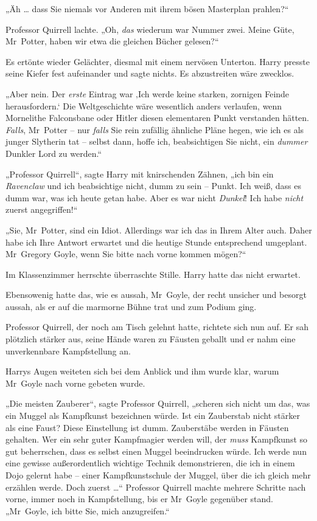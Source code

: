 {„Äh … dass Sie niemals vor Anderen mit ihrem bösen Masterplan prahlen?“

Professor Quirrell lachte. „Oh, \emph{das} wiederum war Nummer zwei. Meine Güte, Mr~Potter, haben wir etwa die gleichen Bücher gelesen?“

Es ertönte wieder Gelächter, diesmal mit einem nervösen Unterton. Harry presste seine Kiefer fest aufeinander und sagte nichts. Es abzustreiten wäre zwecklos.

„Aber nein. Der \emph{erste} Eintrag war ‚Ich werde keine starken, zornigen Feinde herausfordern.` Die Weltgeschichte wäre wesentlich anders verlaufen, wenn Mornelithe Falconsbane oder Hitler diesen elementaren Punkt verstanden hätten. \emph{Falls}, Mr~Potter -- nur \emph{falls} Sie rein zufällig ähnliche Pläne hegen, wie ich es als junger Slytherin tat -- selbst dann, hoffe ich, beabsichtigen Sie nicht, ein \emph{dummer} Dunkler Lord zu werden.“

„Professor Quirrell“, sagte Harry mit knirschenden Zähnen, „ich bin ein \emph{Ravenclaw} und ich beabsichtige nicht, dumm zu sein -- Punkt. Ich weiß, dass es dumm war, was ich heute getan habe. Aber es war nicht \emph{Dunkel}! Ich habe \emph{nicht} zuerst angegriffen!“

„Sie, Mr~Potter, sind ein Idiot. Allerdings war ich das in Ihrem Alter auch. Daher habe ich Ihre Antwort erwartet und die heutige Stunde entsprechend umgeplant. Mr~Gregory Goyle, wenn Sie bitte nach vorne kommen mögen?“

Im Klassenzimmer herrschte überraschte Stille. Harry hatte das nicht erwartet.

Ebensowenig hatte das, wie es aussah, Mr~Goyle, der recht unsicher und besorgt aussah, als er auf die marmorne Bühne trat und zum Podium ging.

Professor Quirrell, der noch am Tisch gelehnt hatte, richtete sich nun auf. Er sah plötzlich stärker aus, seine Hände waren zu Fäusten geballt und er nahm eine unverkennbare Kampfstellung an.

Harrys Augen weiteten sich bei dem Anblick und ihm wurde klar, warum Mr~Goyle nach vorne gebeten wurde.

„Die meisten Zauberer“, sagte Professor Quirrell, „scheren sich nicht um das, was ein Muggel als Kampfkunst bezeichnen würde. Ist ein Zauberstab nicht stärker als eine Faust? Diese Einstellung ist dumm. Zauberstäbe werden in Fäusten gehalten. Wer ein sehr guter Kampfmagier werden will, der \emph{muss} Kampfkunst so gut beherrschen, dass es selbst einen Muggel beeindrucken würde. Ich werde nun eine gewisse außerordentlich wichtige Technik demonstrieren, die ich in einem Dojo gelernt habe -- einer Kampfkunstschule der Muggel, über die ich gleich mehr erzählen werde. Doch zuerst …“ Professor Quirrell machte mehrere Schritte nach vorne, immer noch in Kampfstellung, bis er Mr~Goyle gegenüber stand. „Mr~Goyle, ich bitte Sie, mich anzugreifen.“

}
